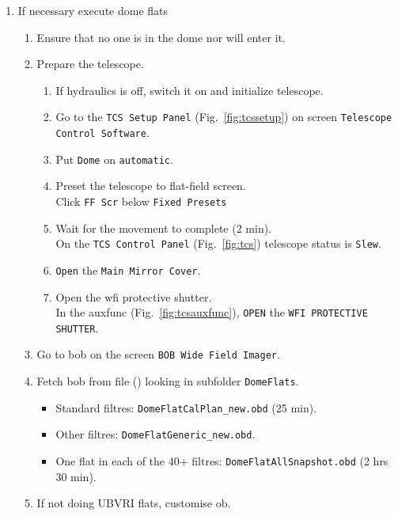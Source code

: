 \documentclass[11pt,fleqn]{book} %
\begin{document}
\begin{enumerate}
  \item If necessary execute dome flats
   \begin{enumerate}
     \item Ensure that no one is in the dome nor will enter it.
     \item Prepare the telescope.
         \begin{enumerate}
            \item If hydraulics is off, switch it on and initialize telescope.
            \item Go to the \texttt{TCS Setup Panel} (Fig.~\ref{fig:tcssetup}) on screen \texttt{Telescope Control Software}.
            \item Put \texttt{Dome} on \texttt{automatic}.
            \item Preset the telescope to flat-field screen.\\
                  Click \texttt{FF Scr} below \texttt{Fixed Presets}
            \item Wait for the movement to complete (2 min).\\
                  On the \texttt{TCS Control Panel} (Fig.~\ref{fig:tcs}) telescope status is \texttt{Slew}.
            \item \texttt{Open} the \texttt{Main Mirror Cover}.
            \item Open the \gls{wfi} protective shutter.\\
                  In the \gls{auxfunc} (Fig.~\ref{fig:tcsauxfunc}), \texttt{OPEN} the \texttt{WFI PROTECTIVE SHUTTER}.
         \end{enumerate}
     \item Go to \gls{bob} on the screen \texttt{BOB Wide Field Imager}.
     \item Fetch \gls{bob} from file (\fetchob) looking in subfolder \texttt{DomeFlats}.
        \begin{itemize}
           \item Standard filtres: \texttt{DomeFlatCalPlan\_new.obd} (25 min).
           \item Other filtres: \texttt{DomeFlatGeneric\_new.obd}.
           \item One flat in each of the 40+ filtres: \texttt{DomeFlatAllSnapshot.obd} (2 hrs 30 min).
        \end{itemize}
     \item If not doing UBVRI flats, customise \gls{ob}.
         \begin{itemize}

\end{itemize}
\end{enumerate}
\end{enumerate}
\end{document}
